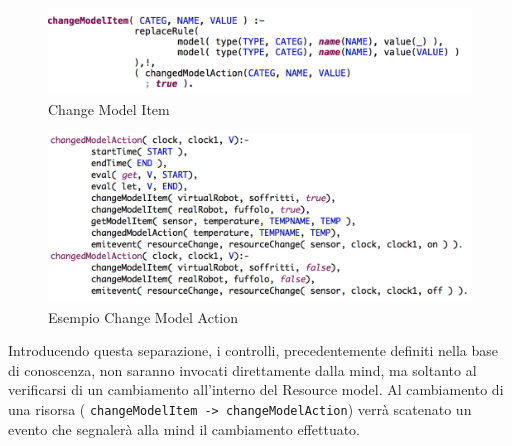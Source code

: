 \documentclass{llncs}
\begin{document}
\begin{figure}
    \centering
    \includegraphics[width=1\textwidth]{Immagini/Requisito4/changeMIReq4.png}
    \caption{Change Model Item}
    \label{fig:CMI}
\end{figure}
\vspace*{1ex}

\begin{figure}
    \centering
    \includegraphics[width=1\textwidth]{Immagini/Requisito4/ChangedModelAction.png}
    \caption{Esempio Change Model Action}
    \label{fig:CMAEx}
\end{figure}
Introducendo questa separazione, i controlli, precedentemente definiti nella base di conoscenza, non saranno invocati direttamente dalla mind, ma soltanto al verificarsi di un cambiamento all'interno del Resource model. Al cambiamento di una risorsa ( \texttt{changeModelItem -> changeModelAction}) verr\`a scatenato un evento che segnaler\`a alla mind il cambiamento effettuato.
\end{document}
